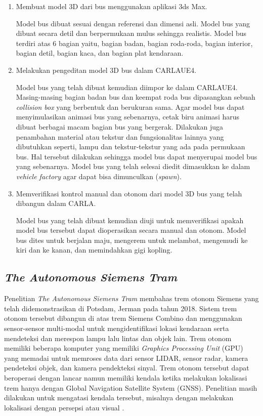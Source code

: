 \begin{enumerate}

    \item Membuat model 3D dari bus menggunakan aplikasi 3ds Max.

    Model bus dibuat sesuai dengan referensi dan dimensi asli. Model bus yang
    dibuat secara detil dan berpermukaan mulus sehingga realistis. Model bus
    terdiri atas 6 bagian yaitu, bagian badan, bagian roda-roda, bagian
    interior, bagian detil, bagian kaca, dan bagian plat kendaraan.

    \item Melakukan pengeditan model 3D bus dalam CARLAUE4.

    Model bus yang telah dibuat kemudian diimpor ke dalam CARLAUE4.
    Masing-masing bagian badan bus dan keempat roda bus dipasangkan sebuah
    \textit{collision box} yang berbentuk dan berukuran sama. Agar model bus
    dapat menyimulasikan animasi bus yang sebenarnya, cetak biru animasi harus
    dibuat berbagai macam bagian bus yang bergerak. Dilakukan juga penambahan
    material atau tekstur dan fungsionalitas lainnya yang dibutuhkan seperti,
    lampu dan tekstur-tekstur yang ada pada permukaan bus. Hal tersebut
    dilakukan sehingga model bus dapat menyerupai model bus yang sebenarnya.
    Model bus yang telah selesai diedit dimasukkan ke dalam \textit{vehicle
    factory} agar dapat bisa dimunculkan (\textit{spawn}).

    \item Memverifikasi kontrol manual dan otonom dari model 3D bus yang telah
    dibangun dalam CARLA.

    Model bus yang telah dibuat kemudian diuji untuk memverifikasi apakah model
    bus tersebut dapat dioperasikan secara manual dan otonom. Model bus dites
    untuk berjalan maju, mengerem untuk melambat, mengemudi ke kiri dan ke
    kanan, dan memindahkan gigi kopling.

\end{enumerate}

\subsection{\textit{The Autonomous Siemens Tram}}

Penelitian \textit{The Autonomous Siemens Tram} membahas trem otonom Siemens
yang telah didemonstrasikan di Potsdam, Jerman pada tahun 2018. Sistem trem
otonom tersebut dibangun di atas trem Siemens Combino dan menggunakan
sensor-sensor multi-modal untuk mengidentifikasi lokasi kendaraan serta
mendeteksi dan merespon lampu lalu lintas dan objek lain. Trem otonom memiliki
beberapa komputer yang memiliki \textit{Graphics Processing Unit} (GPU) yang
memadai untuk memroses data dari sensor LIDAR, sensor radar, kamera pendeteksi
objek, dan kamera pendekteksi sinyal. Trem otonom tersebut dapat beroperasi
dengan lancar namun memiliki kendala ketika melakukan lokalisasi trem hanya
dengan Global Navigation Satellite System (GNSS). Penelitian masih dilakukan
untuk mengatasi kendala tersebut, misalnya dengan melakukan lokalisasi dengan
persepsi atau visual \parencite{at-palmer}.
